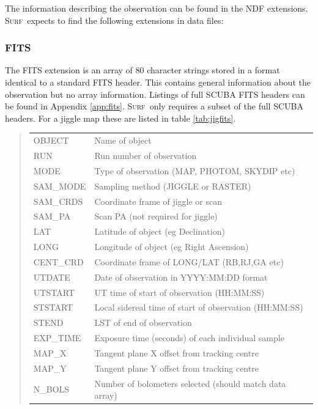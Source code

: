 \documentclass[twoside,11pt,nolof]{starlink}
\newenvironment{myquote}{\begin{quote}\begin{small}}{\end{small}\end{quote}}
\providecommand{\scusoft}          {\textsc{Surf}}
\begin{document}
The information describing the observation can be found in the NDF
extensions. \scusoft\ expects to find the following extensions in
data files:

\subsubsection{FITS}

The FITS extension is an array of 80 character strings stored in a format
identical to a standard FITS header. This contains general information
about the observation but no array information. Listings of full SCUBA
FITS headers can be found in Appendix \ref{app:fits}. \scusoft\ only requires
a subset of the full SCUBA headers. For a jiggle map these are listed
in table \ref{tab:jigfits}.

\begin{table}
\renewcommand{\arraystretch}{1.0}
\begin{myquote}
\begin{tabular}{ll}
OBJECT & Name of object \\
RUN    & Run number of observation \\
MODE   & Type of observation (MAP, PHOTOM, SKYDIP etc) \\
SAM\_MODE & Sampling method (JIGGLE or RASTER) \\
SAM\_CRDS & Coordinate frame of jiggle or scan\\
SAM\_PA & Scan PA (not required for jiggle)\\
LAT    & Latitude of object (eg Declination)\\
LONG   & Longitude of object (eg Right Ascension)\\
CENT\_CRD & Coordinate frame of LONG/LAT (RB,RJ,GA etc)\\
UTDATE & Date of observation in YYYY:MM:DD format\\
UTSTART& UT time of start of observation (HH:MM:SS) \\
STSTART& Local sidereal time of start of observation (HH:MM:SS)\\
STEND  & LST of end of observation\\
EXP\_TIME&Exposure time (seconds) of each individual sample\\
MAP\_X  & Tangent plane X offset from tracking centre\\
MAP\_Y &  Tangent plane Y offset from tracking centre\\
N\_BOLS & Number of bolometers selected (should match data array)\\

\end{tabular}
\end{myquote}
\end{table}
\end{document}
